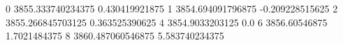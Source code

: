 0 3855.333740234375 0.430419921875
1 3854.694091796875 -0.209228515625
2 3855.266845703125 0.363525390625
4 3854.9033203125 0.0
6 3856.60546875 1.7021484375
8 3860.487060546875 5.583740234375
